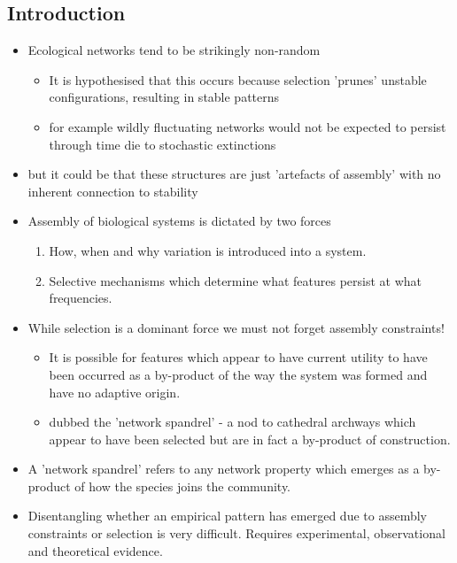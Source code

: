 \subsection*{Introduction}
\begin{itemize}
	\item Ecological networks tend to be strikingly non-random
	\begin{itemize}
		\item It is hypothesised that this occurs because selection 'prunes' unstable configurations, resulting in stable patterns
		\item for example wildly fluctuating networks would not be expected to persist through time die to stochastic extinctions
	\end{itemize}
	\item but it could be that these structures are just 'artefacts of assembly' with no inherent connection to stability
	\item Assembly of biological systems is dictated by two forces
	\begin{enumerate}
		\item How, when and why variation is introduced into a system.
		\item Selective mechanisms which determine what features persist at what frequencies. 
	\end{enumerate}
	\item While selection is a dominant force we must not forget assembly constraints!
	\begin{itemize}
		\item It is possible for features which appear to have current utility to have been occurred as a by-product of the way the system was formed and have no adaptive origin.
		\item dubbed the 'network spandrel' - a nod to cathedral archways which appear to have been selected but are in fact a by-product of construction.
	\end{itemize}
	\item A 'network spandrel' refers to any network property which emerges as a by-product of how the species joins the community.
	\item Disentangling whether an empirical pattern has emerged due to assembly constraints or selection is very difficult. Requires experimental, observational and theoretical evidence.
\end{itemize}

